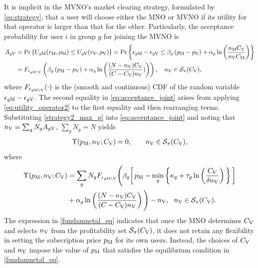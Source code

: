 \documentclass[12pt, draftclsnofoot, onecolumn]{IEEEtran}
\begin{document}
		
		It is implicit in the MVNO's market clearing strategy, formulated by \eqref{eq:strategy}, that a user will choose either the MNO or MVNO if its utility for that operator is larger than that for the other. Particularly, the acceptance probability for user $i$ in group $g$ for joining the MVNO is
		\begin{align}
			A_{g{\rm V}} &= \Pr\left\{ U_{g{\rm M}}(r_{\rm M},p_{\rm M}) \leq  U_{g{\rm V}}(r_{\rm V},p_{\rm V}) \right\} = \Pr\left\{  \epsilon_{g{\rm M}}-\epsilon_{g{\rm V}}\leq \beta_g\left(p_{\rm M}-p_{\rm V} \right)+\alpha_g \ln\left(\frac{n_{\rm M}C_{\rm V}}{n_{\rm V}C_{\rm M}}\right) \right\} \nonumber \\
			&= F_{\epsilon_{g{\rm M}\setminus {\rm V}}}\left(\beta_g\left(p_{\rm M}-p_{\rm V} \right)+\alpha_g \ln\left(\frac{(N-n_{\rm V})C_{\rm V}}{(C-C_{\rm V})n_{\rm V}})\right)\right),\ \ \
			n_{\rm V}\in \mathcal{S}_{\pi}(C_{\rm V}),
			\label{eq:acceptance_joint}
		\end{align}
		where $F_{\epsilon_{g{\rm M}\setminus {\rm V}}}(\cdot)$ is the (smooth and continuous) CDF of the random variable $\epsilon_{g{\rm M}}-\epsilon_{g{\rm V}}$. The second equality in \eqref{eq:acceptance_joint} arises from applying \eqref{eq:utility_operator2} to the first equality and then rearranging terms.	Substituting \eqref{strategy2_max_p} into \eqref{eq:acceptance_joint} and noting that $n_{\rm V}=\sum_g N_g A_{g{\rm V}}$, $\sum_g N_g=N$  yields
		\begin{align}
			\Upsilon(p_{\rm M}, n_{\rm V}; C_{\rm V})=0,\quad \quad n_{\rm V}\in \mathcal{S}_{\pi}(C_{\rm V}), \label{fundamnetal_eq}
		\end{align}
		where
		\begin{align}
			\Upsilon(p_{\rm M}, n_{\rm V}; C_{\rm V})
			&= \sum_{g} N_g  F_{\epsilon_{g{\rm M}\setminus {\rm V}}}\Bigg( \beta_g \bigg[\, p_{\rm M} 
			- \min_g \bigg\{ \kappa_g + \tau_g \ln\left(\frac{C_V}{\delta n_{\rm V}}\right) \bigg\} \, \bigg] \nonumber \\
			&+ \alpha_g \ln\left(\frac{(N-n_{\rm V})C_{\rm V}}{(C-C_{\rm V})n_{\rm V}}\right) \Bigg)-n_{\rm V},\ \  n_{\rm V}\in \mathcal{S}_{\pi}(C_{\rm V}). \label{eq:acceptance_joint2}
		\end{align}
		The expression in \eqref{fundamnetal_eq} indicates that once the MNO determines \(C_{\rm V}\) and selects \(n_{\rm V}\) from the profitability set \(\mathcal{S}_{\pi}(C_{\rm V})\), it does not retain any flexibility in setting the subscription price \(p_{\rm M}\) for its own users. Instead, the choices of \(C_{\rm V}\) and \(n_{\rm V}\) impose the value of \(p_{\rm M}\) that satisfies the equilibrium condition in \eqref{fundamnetal_eq}. 
		
\end{document}
